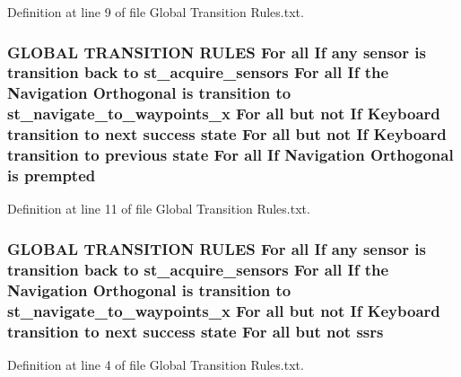 Definition at line 9 of file Global Transition Rules.\+txt.

\subsubsection[{\texorpdfstring{prempted}{prempted}}]{\setlength{\rightskip}{0pt plus 5cm}G\+L\+O\+B\+AL T\+R\+A\+N\+S\+I\+T\+I\+ON R\+U\+L\+ES For all If any sensor is transition back to st\+\_\+acquire\+\_\+sensors For all If the Navigation {\bf Orthogonal} is transition to st\+\_\+navigate\+\_\+to\+\_\+waypoints\+\_\+x For all but not If Keyboard transition to next success state For all but not If Keyboard transition to previous state For all If Navigation {\bf Orthogonal} is prempted}\hypertarget{strikes__back_2docs_2Global_01Transition_01Rules_8txt_ac6583c64beac40f27e253c605d5d5b5b}{}\label{strikes__back_2docs_2Global_01Transition_01Rules_8txt_ac6583c64beac40f27e253c605d5d5b5b}


Definition at line 11 of file Global Transition Rules.\+txt.

\subsubsection[{\texorpdfstring{ssrs}{ssrs}}]{\setlength{\rightskip}{0pt plus 5cm}G\+L\+O\+B\+AL T\+R\+A\+N\+S\+I\+T\+I\+ON R\+U\+L\+ES For all If any sensor is transition back to st\+\_\+acquire\+\_\+sensors For all If the Navigation {\bf Orthogonal} is transition to st\+\_\+navigate\+\_\+to\+\_\+waypoints\+\_\+x For all but not If Keyboard transition to next success state For all but not ssrs}\hypertarget{strikes__back_2docs_2Global_01Transition_01Rules_8txt_aa881c6a22397113c3342bf4c44212934}{}\label{strikes__back_2docs_2Global_01Transition_01Rules_8txt_aa881c6a22397113c3342bf4c44212934}


Definition at line 4 of file Global Transition Rules.\+txt.

